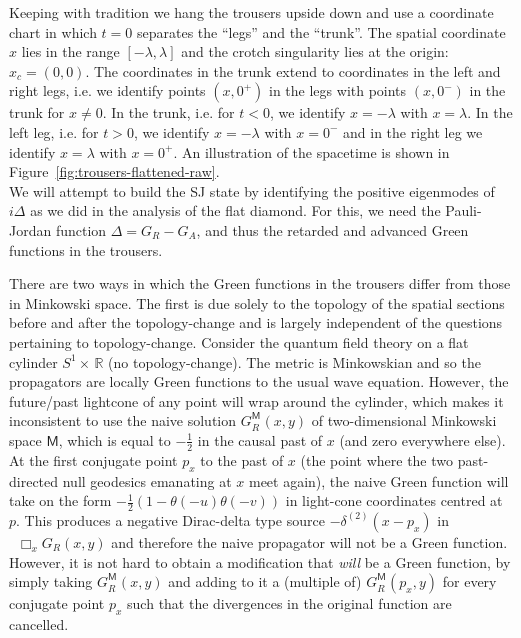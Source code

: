 \documentclass[12pt]{article}
\newcommand*\dAlembert{\mathop{}\!\mathbin\Box}
\begin{document}
Keeping with tradition we hang the trousers upside down and use a coordinate chart in which $t=0$ separates the ``legs'' and the ``trunk''. The spatial coordinate $x$ lies in the range $[-\lambda,\lambda]$ and the crotch singularity lies at the origin: $x_c=(0,0)$. The coordinates in the trunk extend to coordinates in the left and right legs, i.e. we identify points $(x,0^+)$ in the legs with points $(x,0^-)$ in the trunk for $x\neq0$.  In the trunk, i.e. for $t<0$, we identify $x=-\lambda$ with $x=\lambda$. In the left leg, i.e. for $t>0$, we identify $x=-\lambda$ with $x=0^-$ and in the right leg we identify $x=\lambda$ with $x=0^+$. An illustration of the spacetime is shown in Figure~\ref{fig:trousers-flattened-raw}.\\

We will attempt to build the SJ state by identifying the positive eigenmodes of $i\Delta$ as we did in the analysis of the flat diamond. For this, we need the Pauli-Jordan function $\Delta=G_R-G_A$, and thus the retarded and advanced Green functions  in the trousers.

There are two ways in which the Green functions in the trousers differ from those in Minkowski space. The first is due solely to the topology of the spatial sections before and after the topology-change and is largely independent of the questions pertaining to topology-change. Consider the quantum field theory on a flat cylinder $S^1\times\,\mathbb R$ (no topology-change). The metric is Minkowskian and so the propagators are locally Green functions to the usual wave equation. However, the future/past lightcone of any point will wrap around the cylinder, which makes it inconsistent to use the naive solution $G^{\mathsf M_{}}_R(x,y)$ of two-dimensional Minkowski space $\mathsf M$, which is equal to $-\frac12$ in the causal past of $x$ (and zero everywhere else). At the first conjugate point $p_x$ to the past of $x$ (the point where the two past-directed null geodesics emanating at $x$ meet again), the naive Green function will take on the form $-\frac12(1-\theta(- u)\theta(- v))$ in light-cone coordinates centred at $p$. This produces a negative Dirac-delta type source $-\delta^{(2)}(x-p_x)$ in $\dAlembert_x G_R(x,y)$ and therefore the naive propagator will not be a Green function. However, it is not hard to obtain a modification that \emph{will} be a Green function, by simply taking $G^{\mathsf M_{}}_R(x,y)$ and adding to it a (multiple of) $G^{\mathsf M_{}}_R(p_x,y)$ for every conjugate point $p_x$ such that the divergences in the original function are cancelled.
\end{document}
